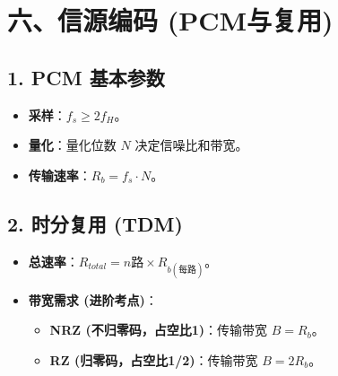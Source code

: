 \documentclass[12pt, a4paper]{article}
\begin{document}
	\section{六、信源编码 (PCM与复用)}
	\subsection{1. PCM 基本参数}
	\begin{itemize}
		\item \textbf{采样}：$f_s \ge 2f_H$。
		\item \textbf{量化}：量化位数 $N$ 决定信噪比和带宽。
		\item \textbf{传输速率}：$R_b = f_s \cdot N$。
	\end{itemize}
	
	\subsection{2. 时分复用 (TDM)}
	\begin{itemize}
		\item \textbf{总速率}：$R_{total} = n \text{路} \times R_{b(\text{每路})}$。
		\item \textbf{带宽需求 (进阶考点)}：
		\begin{itemize}
			\item \textbf{NRZ (不归零码，占空比1)}：传输带宽 $B = R_b$。
			\item \textbf{RZ (归零码，占空比1/2)}：传输带宽 $B = 2 R_b$。
		\end{itemize}
	\end{itemize}
	
\end{document}
